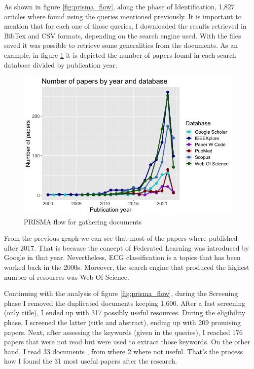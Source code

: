 As shown in figure \ref{fig:prisma_flow}, along the phase of Identification, 1,827 articles where found using the queries mentioned previously. It is important to mention that for each one of those queries, I downloaded the results retrieved in BibTex and CSV formats, depending on the search engine used. With the files saved it was possible to retrieve some generalities from the documents. As an example, in figure \ref{fig:timeline_papers} it is depicted the number of papers found in each search database divided by publication year.

 \begin{figure}[H]
\centering
\includegraphics[scale=0.54]{img/timeline_papers.png}
\caption{PRISMA flow for gathering documents}
\label{fig:timeline_papers}
\end{figure}

From the previous graph we can see that most of the papers where published after 2017. That is because the concept of Federated Learning was introduced by Google in that year. Nevertheless, ECG classification is a topics that has been worked back in the 2000s. Moreover, the search engine that produced the highest number of resources was Web Of Science. 

Continuing with the analysis of figure \ref{fig:prisma_flow}, during the Screening phase I removed the duplicated documents keeping 1,600. After a fast screening (only title), I ended up with 317 possibly useful resources. During the eligibility phase, I screened the latter (title and abstract), ending up with 209 promising papers. Next, after assessing the keywords (given in the queries), I  reached 176 papers that were not read but were used to extract those keywords. On the other hand, I read 33 documents , from where 2 where not useful. That's the process how I found the 31 most useful papers after the research.

